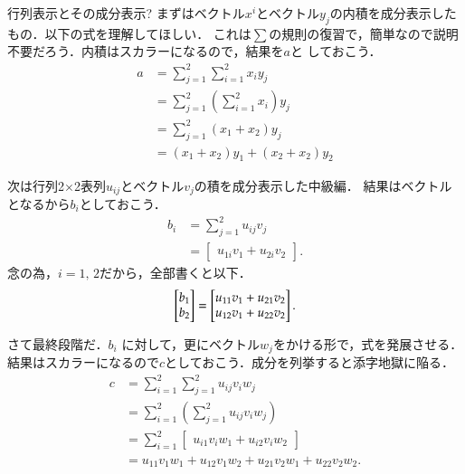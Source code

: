 \begin{memo}{行列表示とその成分表示?}
        まずはベクトル$x^{i}$とベクトル$y_{j}$の内積を成分表示したもの．以下の式を理解してほしい．
        これは$\sum$の規則の復習で，簡単なので説明不要だろう．内積はスカラーになるので，結果を$a$と
        しておこう．
        \begin{align*}
            a &= \sum_{j=1}^{2} \sum_{i=1}^{2} {x}_{i} {y}_{j} \\
              &= \sum_{j=1}^{2} \left( \sum_{i=1}^{2} {x}_{i} \right) {y}_{j} \\
              &= \sum_{j=1}^{2} \left( {x}_{1} + {x}_{2} \right) {y}_{j}    \\
              &= \left( {x}_{1} + {x}_{2} \right) {y}_{1} +\left( {x}_{2} + {x}_{2} \right) {y}_{2}
        \end{align*}

        次は行列2$\times$2表列$u_{ij}$とベクトル$v_{j}$の積を成分表示した中級編．
        結果はベクトルとなるから$b_{i}$としておこう．
        \begin{align*}
            b_{i} &= \sum_{j=1}^{2} {u}_{ij} {v}_{j} \\
                  &=
                  \begin{bmatrix}
                        {u}_{1i} {v}_{1} + {u}_{2i} {v}_{2}
                  \end{bmatrix}.
        \end{align*}
        念の為，$i=1,\,2$だから，全部書くと以下．
        \begin{align*}
            \mqty[ \xmat*{b}{2}{1} ] =
                  \begin{bmatrix}
                        {u}_{11} {v}_{1} + {u}_{21} {v}_{2} \\
                        {u}_{12} {v}_{1} + {u}_{22} {v}_{2}
                  \end{bmatrix}.
        \end{align*}

        さて最終段階だ．$b_{i}$ に対して，更にベクトル$w_{j}$をかける形で，式を発展させる．
        結果はスカラーになるので$c$としておこう．成分を列挙すると添字地獄に陥る．
        \begin{align*}
            c   &= \sum_{i=1}^{2} \sum_{j=1}^{2} {u}_{ij} {v}_{i} {w}_{j} \\
                &= \sum_{i=1}^{2} \left( \sum_{j=1}^{2} {u}_{ij} {v}_{i} {w}_{j} \right) \\
                &= \sum_{i=1}^{2}
                    \begin{bmatrix}
                        {u}_{i1} {v}_{i} {w}_{1} + {u}_{i2} {v}_{i} {w}_{2}
                    \end{bmatrix} \\
                &= {u}_{11} {v}_{1} {w}_{1} + {u}_{12} {v}_{1} {w}_{2}
                  +{u}_{21} {v}_{2} {w}_{1} + {u}_{22} {v}_{2} {w}_{2}.
        \end{align*}


\end{memo}
